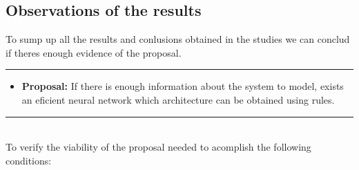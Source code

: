 \documentclass[a4paper, 11pt]{article}
\begin{document}
\subsection{Observations of the results}
To sump up all the results and conlusions obtained in the studies we can conclud if theres enough evidence of the proposal.\\
\rule{\linewidth}{0.4pt}
\begin{itemize}
    \item \textbf{Proposal:} If there is enough information about the system to model, exists an eficient neural network which architecture can be obtained using rules.
\end{itemize}
\rule{\linewidth}{0.4pt}\\ \vspace{0.5em}
To verify the viability of the proposal needed to acomplish the following conditions:
\newpage
\end{document}
